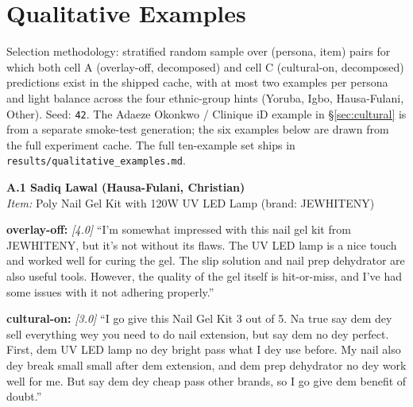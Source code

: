 \documentclass[8pt,twocolumn,a4paper]{extarticle}
\begin{document}


\appendix
\section{Qualitative Examples}
\label{app:qualitative}

Selection methodology: stratified random sample over (persona, item) pairs for which both cell A (overlay-off, decomposed) and cell C (cultural-on, decomposed) predictions exist in the shipped cache, with at most two examples per persona and light balance across the four ethnic-group hints (Yoruba, Igbo, Hausa-Fulani, Other). Seed: \texttt{42}. The Adaeze Okonkwo / Clinique iD example in \S\ref{sec:cultural} is from a separate smoke-test generation; the six examples below are drawn from the full experiment cache. The full ten-example set ships in \texttt{results/qualitative\_examples.md}.

\newcommand{\qualbox}[4]{%
\par\noindent\textbf{\footnotesize #1}\\
{\footnotesize\emph{Item:} #2}\par
\begin{tcolorbox}[colback=gray!4,colframe=gray!50,arc=1.5pt,boxrule=0.3pt,
                  left=3pt,right=3pt,top=1.5pt,bottom=1.5pt,fontupper=\scriptsize,
                  before skip=1pt, after skip=2pt]
\textbf{overlay-off:} #3 \par
\smallskip
\textbf{cultural-on:} #4
\end{tcolorbox}}

\qualbox{A.1 \quad Sadiq Lawal (Hausa-Fulani, Christian)}
{Poly Nail Gel Kit with 120W UV LED Lamp (brand: JEWHITENY)}
{\textit{[4.0]} ``I'm somewhat impressed with this nail gel kit from JEWHITENY, but it's not without its flaws. The UV LED lamp is a nice touch and worked well for curing the gel. The slip solution and nail prep dehydrator are also useful tools. However, the quality of the gel itself is hit-or-miss, and I've had some issues with it not adhering properly.''}
{\textit{[3.0]} ``I go give this Nail Gel Kit 3 out of 5. Na true say dem dey sell everything wey you need to do nail extension, but say dem no dey perfect. First, dem UV LED lamp no dey bright pass what I dey use before. My nail also dey break small small after dem extension, and dem prep dehydrator no dey work well for me. But say dem dey cheap pass other brands, so I go give dem benefit of doubt.''}
\end{document}
